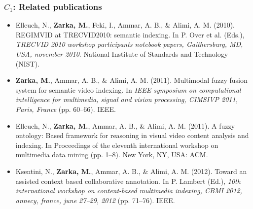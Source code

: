 \begin{frame}
	\frametitle{$C_{1}$: Related publications}
	\begin{block}{}
		{\tiny
		\begin{itemize}
			\item \citep{Elleuch2010} Elleuch, N., \textbf{Zarka, M.}, Feki, I., Ammar, A. B., 
				\&{} Alimi, A. M. (2010). REGIMVID at TRECVID2010: semantic 
				indexing. In P. Over et al. (Eds.), \emph{TRECVID 2010 workshop
				participants notebook papers, Gaithersburg, MD, USA, november 2010}. 
				National Institute of Standards and Technology (\alert{NIST}). 
				
			\item \citep{Zarka2011a} \textbf{Zarka, M.}, Ammar, A. B., \&{} Alimi, A. M. (2011). 
				Multimodal fuzzy fusion system for semantic video indexing. 
				In \emph{IEEE symposium on computational intelligence for multimedia,
				signal and vision processing, CIMSIVP 2011, Paris, France} (pp. 60--66). \alert{IEEE}.

			\item \citep{Elleuch2011} Elleuch, N., \textbf{Zarka, M.}, Ammar, A. B., \&{} Alimi, A. M. (2011). 
				A fuzzy ontology: Based framework for reasoning in visual video content analysis 
				and indexing. In Proceedings of the eleventh international 
				workshop on multimedia data mining (pp. 1--8). New York, NY, USA: \alert{ACM}.
				

			\item \citep{Ksentini2012} Ksentini, N., \textbf{Zarka, M.}, Ammar, A. B., \&{} Alimi, A. M. (2012). 
				Toward an assisted context based collaborative annotation. In P. Lambert (Ed.), 
				\emph{10th international workshop on content-based multimedia indexing, 
				CBMI 2012, annecy, france, june 27--29, 2012} (pp. 71--76). \alert{IEEE}.
				
		\end{itemize}
		}
	\end{block}	
\end{frame}
